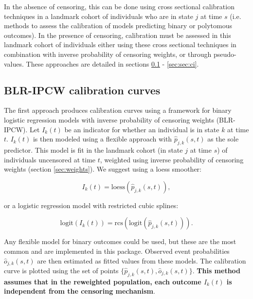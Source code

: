 \documentclass[article,shortnames]{jss}
\begin{document}
In the absence of censoring, this can be done using cross sectional calibration techniques in a landmark \citep{Houwelingen2007, Dafni2011} cohort of individuals who are in state $j$ at time $s$ (i.e. methods to assess the calibration of models predicting binary or polytomous outcomes). In the presence of censoring, calibration must be assessed in this landmark cohort of individuals either using these cross sectional techniques in combination with inverse probability of censoring weights, or through pseudo-values. These approaches are detailed in sections \ref{sec:blripcw} - \ref{sec:sec:ci}.

\subsection{BLR-IPCW calibration curves} \label{sec:blripcw}

The first approach produces calibration curves using a framework for binary logistic regression models with inverse probability of censoring weights (BLR-IPCW). Let $I_{k}(t)$ be an indicator for whether an individual is in state $k$ at time $t$. $I_{k}(t)$ is then modeled using a flexible approach with $\hat{p}_{j, k}(s, t)$ as the sole predictor. This model is fit in the landmark cohort (in state $j$ at time $s$) of individuals uncensored at time $t$, weighted using inverse probability of censoring weights (section \ref{sec:weights}). We suggest using a loess smoother:

\begin{equation}\label{eq:loess}
  I_{k}(t) = \mathrm{loess}(\hat{p}_{j, k}(s, t)),
\end{equation}

or a logistic regression model with restricted cubic splines:

\begin{equation}\label{eq:rcs}
  \mathrm{logit}(I_{k}(t)) = \mathrm{rcs}(\mathrm{logit}(\hat{p}_{j, k}(s, t))).
\end{equation}

Any flexible model for binary outcomes could be used, but these are the most common and are implemented in this package. Observed event probabilities $\hat{o}_{j,k}(s,t)$ are then estimated as fitted values from these models. The calibration curve is plotted using the set of points $\{\hat{p}_{j, k}(s, t), \hat{o}_{j,k}(s,t)\}$. \textbf{This method assumes that in the reweighted population, each outcome $I_{k}(t)$ is independent from the censoring mechanism}.
\end{document}
